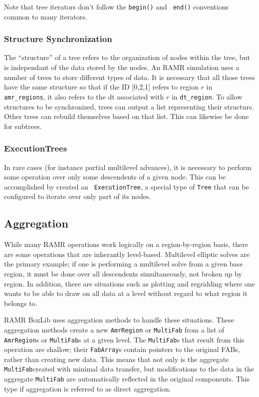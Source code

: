 \documentclass[11pt]{article}
\newcommand{\AR}{{\tt AmrRegion}}
\newcommand{\MF}{{\tt MultiFab}}
\begin{document}
Note that tree iterators don't follow the {\tt begin()} and {\tt 
end()} conventions common to many iterators.

\subsubsection{Structure Synchronization}

The ``structure'' of a tree refers to the organization of nodes within 
the tree, but is independant of the data stored by the nodes. An RAMR 
simulation uses a number of trees to store different types of data. It 
is necessary that all those trees have the same structure so that if 
the ID [0,2,1] refers to region $r$ in {\tt amr\_regions}, it also 
refers to the dt associated with $r$ in {\tt dt\_region}. To allow 
structures to be synchronized, trees can output a list representing 
their structure. Other trees can rebuild themselves based on that 
list. This can likewise be done for subtrees.

\subsubsection{ExecutionTrees}

In rare cases (for instance partial multilevel advances), it is 
necessary to perform some operation over only some descendents of a 
given node. This can be accomplished by created an {\tt 
ExecutionTree}, a special type of {\tt Tree} that can be configured to 
iterate over only part of its nodes.

\subsection{Aggregation}
\label{aggregation}

While many RAMR operations work logically on a region-by-region basis, there are 
some operations that are inherantly level-based. Multilevel elliptic 
solves are the primary example; if one is performing a multilevel 
solve from a given base region, it must be done over all descendents 
simultaneously, not broken up by region. In addition, there are 
situations such as plotting and regridding where one wants to be able 
to draw on all data at a level without regard to what region it 
belongs to. 

RAMR BoxLib uses aggregation methods to handle these situations. These 
aggregation methods create a new \AR{} or \MF{} from a list 
of \AR{}s or {\tt MultiFab}s at a given level. The \MF{}s 
that result from this operation are shallow; their {\tt FabArray}s 
contain pointers to the original FABs, rather than creating new data. 
This means that not only is the aggregate \MF{}created with minimal 
data transfer, but modifications to the data in the aggregate 
\MF{} are automatically reflected in the original components. This 
type if aggregation is referred to as direct aggregation.
\end{document}
